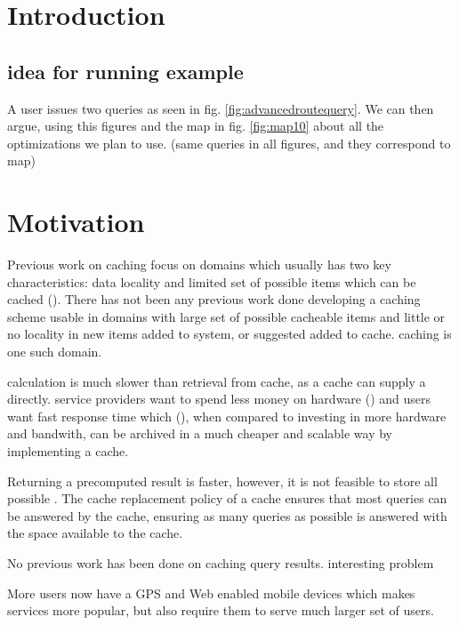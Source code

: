 \section{Introduction} \label{sec:intro}

\subsection{idea for running example}
A user issues two queries as seen in fig. \ref{fig:advancedroutequery}. We can then argue, using this figures and the map in fig. \ref{fig:map10} about all the optimizations we plan to use. (same queries in all figures, and they correspond to map)




\section{Motivation}
Previous work on caching focus on domains which usually has two key characteristics: data locality and limited set of possible items which can be cached (\cite{ref.}). 
There has not been any previous work done developing a caching scheme usable in domains with large set of possible cacheable items and little or no locality in new items added to system, or suggested added to cache. \spath caching is one such domain. 

\spath calculation is much slower than retrieval from cache, as a cache can supply a \spath directly. 
\spath service providers want to spend less money on hardware (\cite{ref.}) and users want fast response time which (\cite{ref.}), when compared to investing in more hardware and bandwith, can be archived in a much cheaper and scalable way by implementing a \spath cache.

Returning a precomputed \spath result is faster, however, it is not feasible to store all possible \spaths. The cache replacement policy of a \spath cache ensures that most queries can be answered by the cache, ensuring as many queries as possible is answered with the space available to the \spath cache.



No previous work has been done on caching \spath query results. interesting problem

More users now have a GPS and Web enabled mobile devices which makes \spath services more popular, but also require them to serve much larger set of users.









